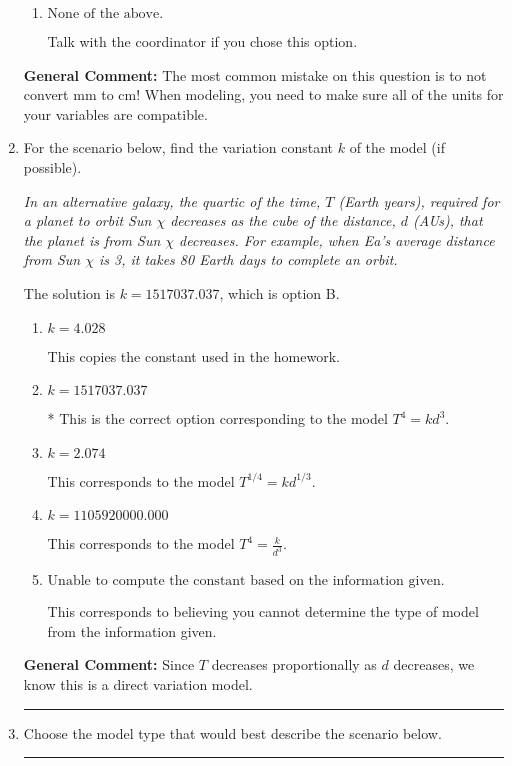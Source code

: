 \documentclass{extbook}[14pt]
\newcommand{\litem}[1]{\item #1

\rule{\textwidth}{0.4pt}}
\begin{document}
\begin{enumerate}
{\begin{enumerate}[label=\Alph*.]
This option uses the model $R = kl^{3}$ as if this is a direct variation AND does not convert from mm to cm so that the units match.
\item \( \text{None of the above.} \)

Talk with the coordinator if you chose this option.
\end{enumerate}

\textbf{General Comment:} The most common mistake on this question is to not convert mm to cm! When modeling, you need to make sure all of the units for your variables are compatible.
}
\litem{
For the scenario below, find the variation constant $k$ of the model (if possible).

\begin{center}
    \textit{ In an alternative galaxy, the quartic of the time, $T$ (Earth years), required for a planet to orbit Sun $\chi$ decreases as the cube of the distance, $d$ (AUs), that the planet is from Sun $\chi$ decreases. For example, when Ea's average distance from Sun $\chi$ is 3, it takes 80 Earth days to complete an orbit. }
\end{center}
The solution is \( k = 1517037.037 \), which is option B.\begin{enumerate}[label=\Alph*.]
\item \( k = 4.028 \)

This copies the constant used in the homework.
\item \( k = 1517037.037 \)

* This is the correct option corresponding to the model $T^{4} = k d^{3}$.
\item \( k = 2.074 \)

This corresponds to the model $T^{1/4} = k d^{1/3}$.
\item \( k = 1105920000.000 \)

This corresponds to the model $T^{4} = \frac{k}{d^{3}}$.
\item \( \text{Unable to compute the constant based on the information given.} \)

This corresponds to believing you cannot determine the type of model from the information given.
\end{enumerate}

\textbf{General Comment:} Since $T$ decreases proportionally as $d$ decreases, we know this is a direct variation model.
}
\litem{
Choose the model type that would best describe the scenario below.

}
\end{enumerate}
\end{document}

